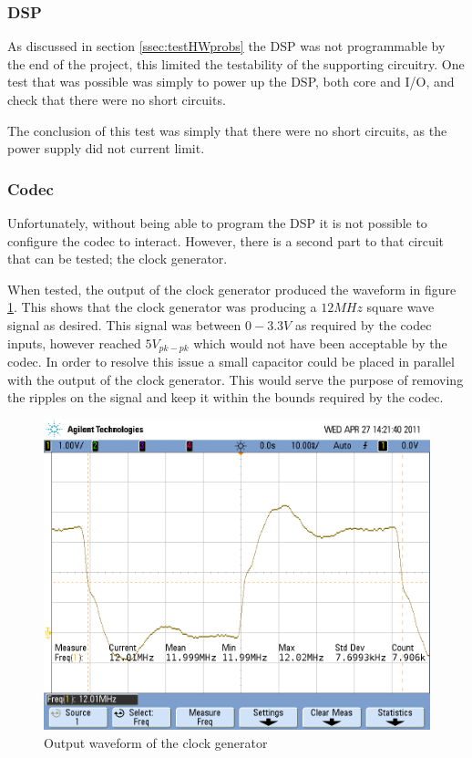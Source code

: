 \subsubsection{DSP}
As discussed in section \ref{ssec:testHWprobs} the DSP was not programmable by the end of the project, this limited the testability of the supporting circuitry.
One test that was possible was simply to power up the DSP, both core and I/O, and check that there were no short circuits.

\noindent The conclusion of this test was simply that there were no short circuits, as the power supply did not current limit.

\subsubsection{Codec}
Unfortunately, without being able to program the DSP it is not possible to configure the codec to interact.
However, there is a second part to that circuit that can be tested; the clock generator.

\noindent When tested, the output of the clock generator produced the waveform in figure \ref{fig:codec12Mclk}.
This shows that the clock generator was producing a $12MHz$ square wave signal as desired.
This signal was between $0-3.3V$ as required by the codec inputs, however reached $5V_{pk-pk}$ which would not have been acceptable by the codec.
In order to resolve this issue a small capacitor could be placed in parallel with the output of the clock generator.
This would serve the purpose of removing the ripples on the signal and keep it within the bounds required by the codec.

\begin{figure}[H]
	\centering
	\includegraphics[width=\textwidth]{./img/codec_12M_clk.png}
	\caption{Output waveform of the clock generator}
	\label{fig:codec12Mclk}
\end{figure}

